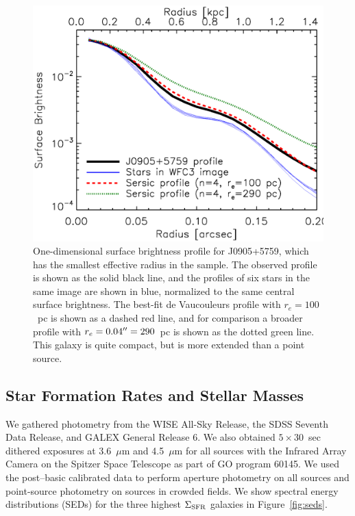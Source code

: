 \documentclass[apj]{emulateapj}
\newcommand{\sigmasfr}{\Sigma_{\textnormal{\scriptsize{SFR}}}}
\begin{document}
\begin{figure}[!t]
\includegraphics[angle=0,scale=0.41]{f2.ps}
\caption{One-dimensional surface brightness profile for J0905+5759,
  which has the smallest effective radius in the sample.  The observed
  profile is shown as the solid black line, and the profiles of six
  stars in the same image are shown in blue, normalized to the same
  central surface brightness.  The best-fit de Vaucouleurs profile
  with $r_e=100$~pc is shown as a dashed red line, and for comparison
  a broader profile with $r_e=0.04\mbox{$^{\prime\prime}$}=290$~pc is shown as the
  dotted green line.  This galaxy is quite compact, but is more
  extended than a point source.}
\label{fig:profile}
\end{figure}

\subsection{Star Formation Rates and Stellar Masses}\label{sec:seds}

We gathered photometry from the WISE All-Sky Release, the SDSS Seventh
Data Release, and GALEX General Release 6.  We also obtained
$5\times30$~sec dithered exposures at 3.6~$\mu$m and 4.5~$\mu$m for
all sources with the Infrared Array Camera on the Spitzer Space
Telescope as part of GO program 60145.  We used the post--basic
calibrated data to perform aperture photometry on all sources and
point-source photometry on sources in crowded fields.  We show
spectral energy distributions (SEDs) for the three highest $\sigmasfr$
galaxies in Figure~\ref{fig:seds}.
\end{document}
